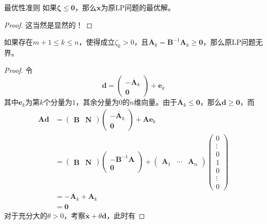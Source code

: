 \documentclass[lang = cn, scheme = chinese, thmcnt = section]{elegantbook}
\newcommand{\bs}{\boldsymbol}          %
\begin{document}
\begin{theorem}{最优性准则}
	如果$\bs{\zeta}\le \bs{0}$，那么$\overline{\bs{x}}$为原LP问题的最优解。
\end{theorem}

\begin{proof}
	这当然是显然的！
\end{proof}

\begin{theorem}
	如果存在$m+1\le k\le n$，使得成立$\zeta_k>0$，且$\overline{\bs{A}}_k=\bs{B}^{-1}\bs{A}_k\ge \bs{0}$，那么原LP问题无界。
\end{theorem}

\begin{proof}
	令
	$$
	\bs{d}=\begin{pmatrix}
		-\overline{\bs{A}}_k\\\bs{0}
	\end{pmatrix}
	+\bs{e}_k
	$$
	其中$\bs{e}_k$为第$k$个分量为$1$，其余分量为$0$的$n$维向量。由于$\overline{\bs{A}}_k\le \bs{0}$，那么$\bs{d}\ge \bs{0}$，而
	\begin{align*}
		\bs{Ad}
		& = \begin{pmatrix}
			\bs{B} & \bs{N}
		\end{pmatrix}
		\begin{pmatrix}
			-\overline{\bs{A}}_k\\\bs{0}
		\end{pmatrix}
		+\bs{Ae}_k\\
		& = \begin{pmatrix}
			\bs{B} & \bs{N}
		\end{pmatrix}
		\begin{pmatrix}
			-\bs{B}^{-1}\bs{A}\\\bs{0}
		\end{pmatrix}
		+\begin{pmatrix}
			\bs{A}_1 & \cdots & \bs{A}_n
		\end{pmatrix}
		\begin{pmatrix}
			0 \\ \vdots \\ 0 \\ 1 \\ 0 \\ \vdots \\ 0
		\end{pmatrix}\\
		& = -\bs{A}_k+\bs{A}_k\\
		& = \bs{0}
	\end{align*}
	对于充分大的$\theta>0$，考察$\overline{\bs{x}}+\theta\bs{d}$，此时有

\end{proof}
\end{document}
